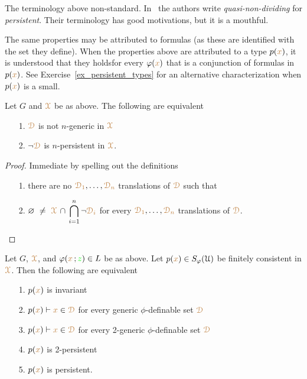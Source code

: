\noindent\llap{\textcolor{red}{\Large\warning}\kern1.5ex}\ignorespaces
The terminology above non-standard.
In~\cite{CK} the authors write \textit{quasi-non-dividing\/} for \textit{persistent}.
Their terminology has good motivations, but it is a mouthful.

The same properties may be attributed to formulas (as these are identified with the set they define).
When the properties above are attributed to a type $p({\color{brown} x})$, it is understood that they holdsfor every $\varphi({\color{brown} x})$ that is a conjunction of formulas in $p({\color{brown} x})$.
See Exercise~\ref{ex_persistent_types} for an alternative characterization when $p({\color{brown} x})$ is a small.

\begin{fact}\label{fact_fip}
  Let $G$ and ${\color{brown}\EuScript X}$ be as above.
  The following are equivalent
  \begin{itemize}
    \item[1.] ${\color{brown}\EuScript D}$ is not $n$-generic in ${\color{brown}\EuScript X}$
    \item[2.] $\neg{\color{brown}\EuScript D}$ is $n$-persistent in ${\color{brown}\EuScript X}$.
  \end{itemize}
\end{fact}

\begin{proof}
  Immediate by spelling out the definitions\smallskip
  \begin{itemize}
    \item[1.] there are no ${\color{brown}\EuScript D_1},\dots,{\color{brown}\EuScript D_n}$ translations of ${\color{brown}\EuScript D}$ such that 
    \item[2.]  $\displaystyle\0\ \neq\ \mrX\,\cap\,\bigcap_{i=1}^n\neg{\mr\D_i}$ for every ${\color{brown}\EuScript D_1},\dots,{\color{brown}\EuScript D_n}$ translations of ${\color{brown}\EuScript D}$.\qedhere
  \end{itemize} 
\end{proof}

\begin{theorem}\label{thm_generic_invariant}
  Let $G$, ${\color{brown}\EuScript X}$, and $\varphi({\color{brown} x}\,;{\color{green} z})\in L$ be as above.
  Let $p({\color{brown} x})\in S_\varphi(\EuScript U)$ be finitely consistent in ${\color{brown}\EuScript X}$.
  Then the following are equivalent
  \begin{itemize}
    \item[1.] $p({\color{brown} x})$ is invariant
    \item[2.] $p({\color{brown} x})\vdash{\color{brown}x}\in{\color{brown}\EuScript D}$ for every generic $\phi$-definable set ${\color{brown}\EuScript D}$
    \item[3.] $p({\color{brown} x})\vdash{\color{brown}x}\in{\color{brown}\EuScript D}$ for every 2-generic $\phi$-definable set ${\color{brown}\EuScript D}$
    \item[4.] $p({\color{brown} x})$ is 2-persistent
    \item[5.] $p({\color{brown} x})$ is persistent.
  \end{itemize}
\end{theorem}

